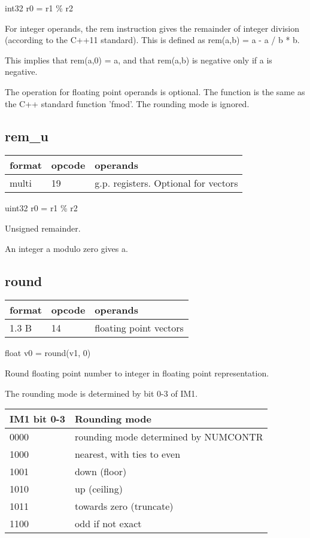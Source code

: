 \documentclass[forwardcom.tex]{subfiles}
\begin{document}
int32 r0 = r1 \% r2
\vv

For integer operands, the rem instruction gives the remainder of integer division (according to the C++11 standard). 
This is defined as rem(a,b) = a - a / b * b. 

This implies that rem(a,0) = a, and that rem(a,b) is negative only if a is negative.
\vv

The operation for floating point operands is optional. The function is the same as the C++ standard function 'fmod'. The rounding mode is ignored.
\vv


\subsection{rem\_u}
\label{table:remUInstruction}
\begin{tabular}{|p{12mm}|p{15mm}|p{100mm}|}
\hline
\bfseries format & \bfseries opcode & \bfseries operands \\ \hline
multi & 19 & g.p. registers. Optional for vectors \\ \hline
\end{tabular}
\vv

uint32 r0 = r1 \% r2
\vv

Unsigned remainder.
\vv

An integer a modulo zero gives a.
\vv


\subsection{round}
\label{table:roundInstruction}
\begin{tabular}{|p{12mm}|p{15mm}|p{100mm}|}
\hline
\bfseries format & \bfseries opcode & \bfseries operands \\ \hline
1.3 B & 14 & floating point vectors \\ \hline
\end{tabular}
\vv

float v0 = round(v1, 0)
\vv

Round floating point number to integer in floating point representation.
\vv

The rounding mode is determined by bit 0-3 of IM1.
\vv

\label{table:roundOptions}
\begin{tabular}{|p{20mm}|p{110mm}|}
\hline
\bfseries IM1 bit 0-3 & \bfseries Rounding mode \\ \hline
0000 & rounding mode determined by NUMCONTR \\
1000 & nearest, with ties to even \\
1001 & down (floor) \\
1010 & up (ceiling) \\
1011 & towards zero (truncate) \\
1100 & odd if not exact \\
\hline
\end{tabular}
\vv
\end{document}
